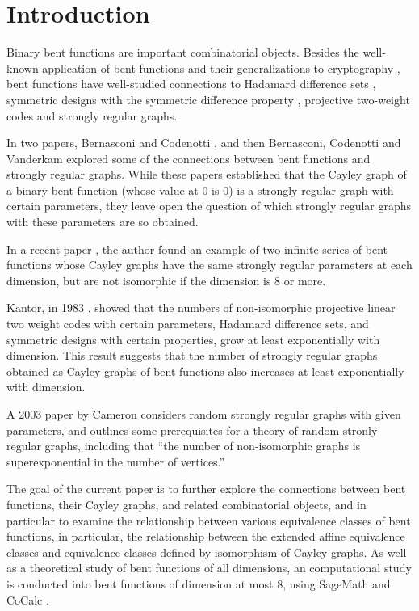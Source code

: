 \section{Introduction}
\label{sec-Introduction}
Binary bent functions are important combinatorial objects.
Besides the well-known application of bent functions and their generalizations to cryptography
\cite{Ada97} \cite[4.1-4.6]{Tok15bent},
bent functions have well-studied connections to Hadamard difference sets \cite{Dil74},
symmetric designs with the symmetric difference property \cite{DilS87block,Kan75symplectic},
projective two-weight codes \cite{CalK1986,Din2015} and strongly regular graphs.

In two papers, Bernasconi and Codenotti \cite{BerC99}, and then Bernasconi, Codenotti and Vanderkam
\cite{BerCV01} explored some of the connections
between bent functions and strongly regular graphs.
While these papers established that the Cayley graph of a binary bent function (whose value at 0 is
0) is a strongly regular graph
with certain parameters, they leave open the question of which strongly regular graphs with these
parameters are so obtained.

In a recent paper \cite{Leo17Hurwitz},
the author found an example of two infinite series of bent functions whose
Cayley graphs have the same strongly regular parameters at each dimension,
but are not isomorphic if the dimension is 8 or more.

Kantor, in 1983 \cite{Kan83exponential}, showed that the numbers of non-isomorphic projective linear
two weight codes with certain parameters,
Hadamard difference sets, and symmetric designs with certain properties, grow at least exponentially
with dimension.
This result suggests that the number of strongly regular graphs obtained as Cayley graphs of bent
functions also increases at least exponentially with dimension.


A 2003 paper by Cameron \cite{Cam2003} considers random strongly regular graphs with given parameters,
and outlines some prerequisites for a theory of random stronly regular graphs, including that
``the number of non-isomorphic graphs is superexponential in the number of vertices.''

The goal of the current paper is to further explore the connections between bent functions, their
Cayley graphs, and related combinatorial objects,
and in particular to examine the relationship between various equivalence classes of bent
functions, in particular, the relationship between the extended affine
equivalence classes and equivalence classes defined by isomorphism of Cayley graphs.
As well as a theoretical study of bent functions of all dimensions, an computational study is conducted
into bent functions of dimension at most 8,
using SageMath \cite{SageMath7517} and CoCalc \cite{CoCalc}.

